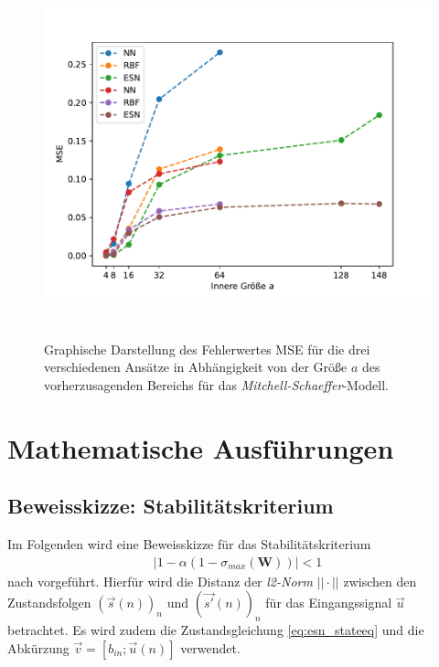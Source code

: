 \begin{appendices}
\begin{figure}[h]
	\centering
	\includegraphics[height=4.2in]{figures/results/inner_cross_prediction/mitchell_error_size_comparison.pdf}
	\caption{Graphische Darstellung des Fehlerwertes MSE für die drei verschiedenen Ansätze in Abhängigkeit von der Größe $a$ des vorherzusagenden Bereichs für das \textit{Mitchell-Schaeffer}-Modell.}
	\label{fig:apx_inner_prediction_error_size_comparison_ms}
\end{figure} 


\chapter{Mathematische Ausführungen}
\section{Beweisskizze: Stabilitätskriterium}
\label{sc:apx_math_stability_proof}
Im Folgenden wird eine Beweisskizze für das Stabilitätskriterium
\begin{align*}
|1-\alpha(1-\sigma_{max}(\mathbf{W}))| < 1
\end{align*}
nach \cite{jaeger2010} vorgeführt. Hierfür wird die Distanz der \textit{l2-Norm} $||\cdot||$ zwischen den Zustandsfolgen $(\vec{s}(n))_n$ und $(\vec{s'}(n))_n$ für das Eingangssignal $\vec{u}$ betrachtet. Es wird zudem die Zustandsgleichung \ref{eq:esn_stateeq} und die Abkürzung $\vec{v} = [b_{in}; \vec{u}(n)]$ verwendet. 


\end{appendices}
